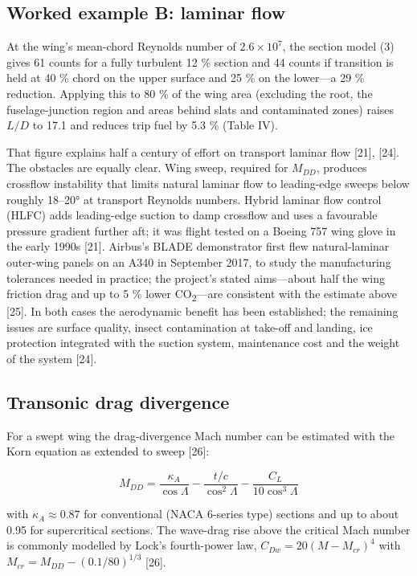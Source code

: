 \documentclass[10pt,a4paper,twocolumn]{article}
\begin{document}
\hypertarget{worked-example-b-laminar-flow}{%
\subsection{Worked example B: laminar
flow}\label{worked-example-b-laminar-flow}}

At the wing's mean-chord Reynolds number of \(2.6\times10^7\), the
section model (3) gives 61 counts for a fully turbulent 12 \% section
and 44 counts if transition is held at 40 \% chord on the upper surface
and 25 \% on the lower---a 29 \% reduction. Applying this to 80 \% of
the wing area (excluding the root, the fuselage-junction region and
areas behind slats and contaminated zones) raises \(L/D\) to 17.1 and
reduces trip fuel by 5.3 \% (Table IV).

That figure explains half a century of effort on transport laminar flow
{[}21{]}, {[}24{]}. The obstacles are equally clear. Wing sweep,
required for \(M_{DD}\), produces crossflow instability that limits
natural laminar flow to leading-edge sweeps below roughly 18--20° at
transport Reynolds numbers. Hybrid laminar flow control (HLFC) adds
leading-edge suction to damp crossflow and uses a favourable pressure
gradient further aft; it was flight tested on a Boeing 757 wing glove in
the early 1990s {[}21{]}. Airbus's BLADE demonstrator first flew
natural-laminar outer-wing panels on an A340 in September 2017, to study
the manufacturing tolerances needed in practice; the project's stated
aims---about half the wing friction drag and up to 5 \% lower
CO\textsubscript{2}---are consistent with the estimate above {[}25{]}.
In both cases the aerodynamic benefit has been established; the
remaining issues are surface quality, insect contamination at take-off
and landing, ice protection integrated with the suction system,
maintenance cost and the weight of the system {[}24{]}.

\hypertarget{transonic-drag-divergence}{%
\subsection{Transonic drag divergence}\label{transonic-drag-divergence}}

For a swept wing the drag-divergence Mach number can be estimated with
the Korn equation as extended to sweep {[}26{]}:

\[M_{DD} = \frac{\kappa_A}{\cos\Lambda} - \frac{t/c}{\cos^2\Lambda} - \frac{C_L}{10\cos^3\Lambda} \tag{12}\]

with \(\kappa_A\approx0.87\) for conventional (NACA 6-series type)
sections and up to about 0.95 for supercritical sections. The wave-drag
rise above the critical Mach number is commonly modelled by Lock's
fourth-power law, \(C_{Dw}=20(M-M_{cr})^4\) with
\(M_{cr}=M_{DD}-(0.1/80)^{1/3}\) {[}26{]}.
\end{document}
